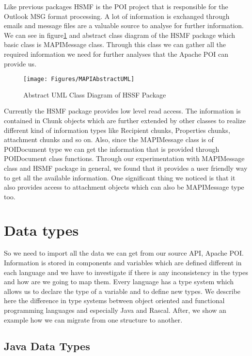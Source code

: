 Like previous packages HSMF is the POI project that is responsible for the Outlook MSG format processing. A lot of information is exchanged through emails and message files are a valuable source to analyse for further information. We can see in figure\ref{fig:MAPIUML} and abstract class diagram of the HSMF package which basic class is MAPIMessage class. Through this class we can gather all the required information we need for further analyses that the Apache POI can provide us. 

\begin{figure}[h]
\texttt{[image: Figures/MAPIAbstractUML]}
\caption{Abstract UML Class Diagram of HSSF Package}
\label{fig:MAPIUML}
\end{figure}

Currently the HSMF package provides low level read access. The information is contained in Chunk objects which are further extended by other classes to realize different kind of information types like Recipient chunks, Properties chunks, attachment chunks and so on. Also, since the MAPIMessage class is of POIDocument type we can get the information that is provided through POIDocument class functions. Through our experimentation with MAPIMessage class and HSMF package in general, we found that it provides a user friendly way to get all the available information. One significant thing we noticed is that it also provides access to attachment objects which can also be MAPIMessage type too.




\section{Data types}
So we need to import all the data we can get from our source API, Apache POI. Information is stored in components and variables which are defined different in each language and we have to investigate if there is any inconsistency in the types and how are we going to map them. Every language has a type system which allows us to declare the type of a variable and to define new types. We describe here the difference in type systems between object oriented and functional programming languages and especially Java and Rascal. After, we show an example how we can migrate from one structure to another. 

\subsection{Java Data Types}

